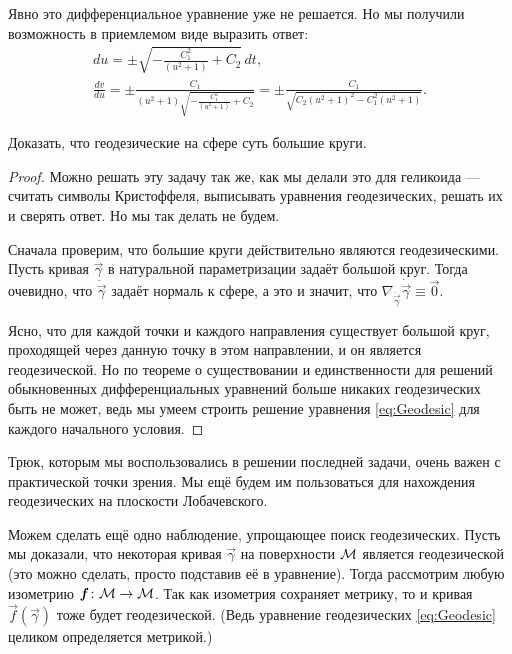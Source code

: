 \begin{solution}
	Явно это дифференциальное уравнение уже не решается. Но мы получили возможность в приемлемом виде выразить ответ:
	\begin{gather*}
		du = \pm\sqrt{-\frac{C_1^2}{(u^2 + 1)} + C_2}\,dt,\\
		\frac{dv}{du} = \pm\frac{C_1}{(u^2 + 1)\sqrt{-\frac{C_1^2}{(u^2 + 1)} + C_2}} = \pm\frac{C_1}{\sqrt{C_2(u^2 + 1)^2 - C_1^2(u^2 + 1)}}.
	\end{gather*}
\end{solution}

\begin{problem} \label{eq:GeodesicSphere}
	Доказать, что геодезические на сфере суть большие круги.
\end{problem}

\begin{proof}
	Можно решать эту задачу так же, как мы делали это для геликоида --- считать символы Кристоффеля, выписывать уравнения геодезических, решать их и сверять ответ. Но мы так делать не будем\footnotemark.


	Сначала проверим, что большие круги действительно являются геодезическими. Пусть кривая $\vec{\gamma}$ в натуральной параметризации задаёт большой круг. Тогда очевидно, что $\ddot{\vec{\gamma}}$ задаёт нормаль к сфере, а это и значит, что $\nabla_{\dot{\vec{\gamma}}}\dot{\vec{\gamma}} \equiv \vec{0}$.

	Ясно, что для каждой точки и каждого направления существует большой круг, проходящей через данную точку в этом направлении, и он является геодезической. Но по теореме о существовании и единственности для решений обыкновенных дифференциальных уравнений больше никаких геодезических быть не может, ведь мы умеем строить решение уравнения \eqref{eq:Geodesic} для каждого начального условия.
\end{proof}

Трюк, которым мы воспользовались в решении последней задачи, очень важен с практической точки зрения. Мы ещё будем им пользоваться для нахождения геодезических на плоскости Лобачевского.

Можем сделать ещё одно наблюдение, упрощающее поиск геодезических. Пусть мы доказали, что некоторая кривая $\vec{\gamma}$ на поверхности $\mathcal{M}$ является геодезической (это можно сделать, просто подставив её в уравнение). Тогда рассмотрим любую изометрию $\boldsymbol{f}\colon \mathcal{M} \to \mathcal{M}$. Так как изометрия сохраняет метрику, то и кривая $\vec{f}(\vec{\gamma})$ тоже будет геодезической. (Ведь уравнение геодезических \eqref{eq:Geodesic} целиком определяется метрикой.)

